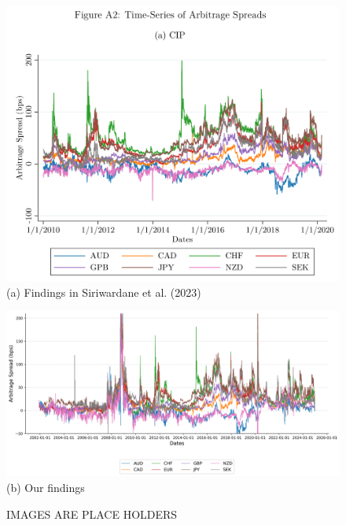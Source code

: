 \documentclass{article}
\begin{document}
\begin{appendices}
\begin{figure}[htbp]
  \centering
  \begin{minipage}[b]{0.48\textwidth}
    \centering
    \includegraphics[width=\linewidth]{../docs_src/SegArb_CIP_Timeseries.png}
    \\[1ex] %
    {\small (a) Findings in Siriwardane et al. (2023)}
  \end{minipage}
  \hfill
  \begin{minipage}[b]{0.48\textwidth}
    \centering
    \includegraphics[width=\linewidth]{../docs_src/CIP_replicate.png}
    \\[1ex]
    {\small (b) Our findings}
  \end{minipage}
  \caption{IMAGES ARE PLACE HOLDERS}
  \label{fig:comparison-minipage}
\end{figure}

\FloatBarrier


\end{appendices}
\end{document}
